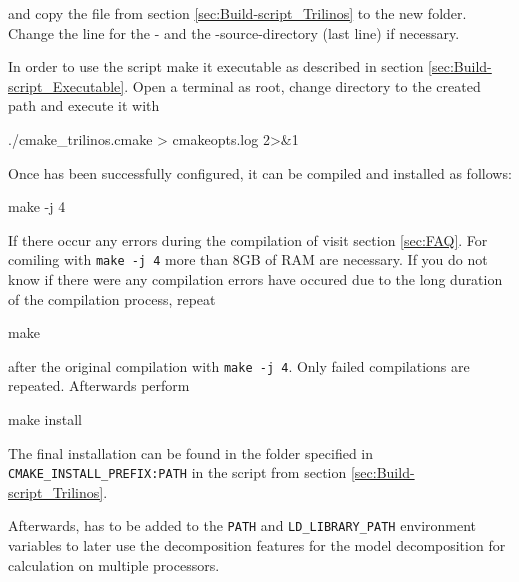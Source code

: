 and copy the file from section \ref{sec:Build-script_Trilinos} to the new folder. Change the line for the \marktool{\openmpiname}- and the \marktool{\trilinosname}-source-directory (last line) if necessary.

In order to use the script make it executable as described in section \ref{sec:Build-script_Executable}. Open a terminal as root, change directory to the created path and execute it with

\begin{code}
./cmake_trilinos.cmake > cmakeopts.log 2>&1
\end{code}

Once \marktool{\trilinosname} has been successfully configured, it can be compiled and installed as follows:

\begin{code}
make -j 4
\end{code}

If there occur any errors during the compilation of \marktool{\trilinosname} visit section \ref{sec:FAQ}. For comiling with \verb+make -j 4+ more than 8GB of RAM are necessary. If you do not know if there were any compilation errors have occured due to the long duration of the compilation process, repeat

\begin{code}
make
\end{code}

after the original compilation with \verb+make -j 4+. Only failed compilations are repeated. Afterwards perform

\begin{code}
make install
\end{code}

The final installation can be found in the folder specified in \verb+CMAKE_INSTALL_PREFIX:PATH+ in the script from section \ref{sec:Build-script_Trilinos}.

Afterwards, \marktool{\trilinosname} has to be added to the \verb+PATH+ and \verb+LD_LIBRARY_PATH+ environment variables to later use the \marktool{\trilinosname} decomposition features for the model decomposition for calculation on multiple processors.

\begingroup
\lstset{breaklines = true}

\endgroup 